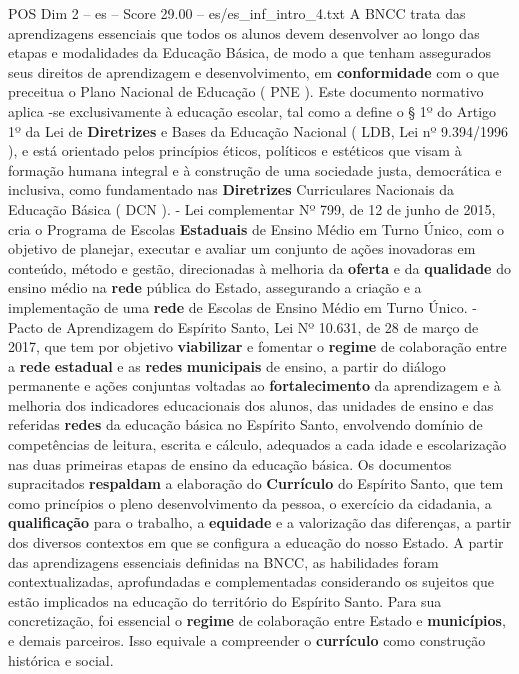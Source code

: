 \begin{textsample}{POS Dim 2 – es – Score 29.00 – es/es\_inf\_intro\_4.txt}
A BNCC trata das aprendizagens essenciais que todos os alunos devem desenvolver ao longo das etapas e modalidades da Educação Básica, de modo a que tenham assegurados seus direitos de aprendizagem e desenvolvimento, em \textbf{conformidade} com o que preceitua o Plano Nacional de Educação ( PNE ).
Este documento normativo aplica -se exclusivamente à educação escolar, tal como a define o § 1º do Artigo 1º da Lei de \textbf{Diretrizes} e Bases da Educação Nacional ( LDB, Lei nº 9.394/1996 ), e está orientado pelos princípios éticos, políticos e estéticos que visam à formação humana integral e à construção de uma sociedade justa, democrática e inclusiva, como fundamentado nas \textbf{Diretrizes} Curriculares Nacionais da Educação Básica ( DCN ). - Lei complementar Nº 799, de 12 de junho de 2015, cria o Programa de Escolas \textbf{Estaduais} de Ensino Médio em Turno Único, com o objetivo de planejar, executar e avaliar um conjunto de ações inovadoras em conteúdo, método e gestão, direcionadas à melhoria da \textbf{oferta} e da \textbf{qualidade} do ensino médio na \textbf{rede} pública do Estado, assegurando a criação e a implementação de uma \textbf{rede} de Escolas de Ensino Médio em Turno Único. - Pacto de Aprendizagem do Espírito Santo, Lei Nº 10.631, de 28 de março de 2017, que tem por objetivo \textbf{viabilizar} e fomentar o \textbf{regime} de colaboração entre a \textbf{rede} \textbf{estadual} e as \textbf{redes} \textbf{municipais} de ensino, a partir do diálogo permanente e ações conjuntas voltadas ao \textbf{fortalecimento} da aprendizagem e à melhoria dos indicadores educacionais dos alunos, das unidades de ensino e das referidas \textbf{redes} da educação básica no Espírito Santo, envolvendo domínio de competências de leitura, escrita e cálculo, adequados a cada idade e escolarização nas duas primeiras etapas de ensino da educação básica.
Os documentos supracitados \textbf{respaldam} a elaboração do \textbf{Currículo} do Espírito Santo, que tem como princípios o pleno desenvolvimento da pessoa, o exercício da cidadania, a \textbf{qualificação} para o trabalho, a \textbf{equidade} e a valorização das diferenças, a partir dos diversos contextos em que se configura a educação do nosso Estado.
A partir das aprendizagens essenciais definidas na BNCC, as habilidades foram contextualizadas, aprofundadas e complementadas considerando os sujeitos que estão implicados na educação do território do Espírito Santo.
Para sua concretização, foi essencial o \textbf{regime} de colaboração entre Estado e \textbf{municípios}, e demais parceiros.
Isso equivale a compreender o \textbf{currículo} como construção histórica e social.

\end{textsample}
